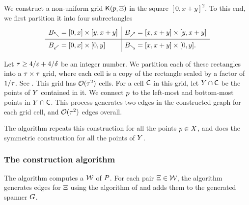 \documentclass[12pt]{article}%
\begin{document}
We construct a non-uniform grid $\mathsf{K}(p, \Xi)$ in the square
$[0,x+y]^2$.  To this end, we first partition it into four
subrectangles
\begin{equation*}
    \begin{array}{l|l}
      B_\nwarrow = [0,x] \times [y,x+y]
      &
        B_\nearrow = [x,x+y] \times [y,x+y]\Bigr.\\
      \hline
      B_{\swarrow} = [0,x]\times [0,y]
      &
        B_\searrow = [x,x+y] \times [0,y].\Bigr.\\
    \end{array}
\end{equation*}


Let $\tau \geq 4/\varepsilon + 4/\delta$ be an integer number.  We partition each of these rectangles into a
$\tau \times \tau$ grid, where each cell is a copy of the rectangle scaled by a factor of $1/\tau$.  See . This grid has $\mathcal{O}(\tau^2)$
cells. For a cell $\mathsf{C}$ in this grid, let $Y \cap \mathsf{C}$ be the
points of $Y$ contained in it. We connect $p$ to the left-most
and bottom-most points in $Y \cap \mathsf{C}$. This process generates
two edges in the constructed graph for each grid cell, and
$\mathcal{O}( \tau^2)$ edges overall.

The algorithm repeats this construction for all the points
$p \in X$, and does the symmetric construction for all the points
of $Y$.


\subsubsection{The construction algorithm}

The algorithm computes a \QSPD $\mathcal{W}$ of $P$. For each pair
$\Xi \in \mathcal{W}$, the algorithm generates edges for $\Xi$ using the
algorithm of  and adds them to the generated
spanner $G$.
\end{document}
